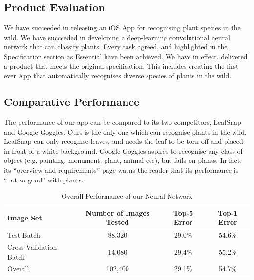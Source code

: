 \documentclass[a4paper,11pt]{article}
\begin{document}
\begin{description}
\subsection{Product Evaluation}


We have succeeded in releasing an iOS App for recognising plant species in the wild. We have succeeded in developing a deep-learning convolutional neural network that can classify plants. Every task agreed, and highlighted in the Specification section as Essential have been achieved. We have in effect, delivered a product that meets the original specification. This includes creating the first ever App that automatically recognises diverse species of plants in the wild.

\subsection{Comparative Performance}

The performance of our app can be compared to its two competitors, LeafSnap and Google Goggles. Ours is the only one which can recognise plants in the wild. LeafSnap can only recognise leaves, and needs the leaf to be torn off and placed in front of a white background. Google Goggles aspires to recognise any class of object (e.g. painting, monument, plant, animal etc), but fails on plants. In fact, its ``overview and requirements'' page warns the reader that its performance is ``not so good'' with plants.\\

\begin{table}[h]
   \centering
    \begin{tabular}{|l|ccc|}
    \hline
    Image Set & Number of Images Tested & Top-5 Error & Top-1 Error \\ 
   \hline
    Test Batch & 88,320 & 29.0\% & 54.6\%      \\
    Cross-Validation Batch  & 14,080 & 29.4\% & 55.2\%      \\
    \hline
    Overall & 102,400 & 29.1\% & 54.7\%      \\     
    \hline
    \end{tabular}
    \caption {Overall Performance of our Neural Network}
\end{table}


\end{description}
\end{document}
